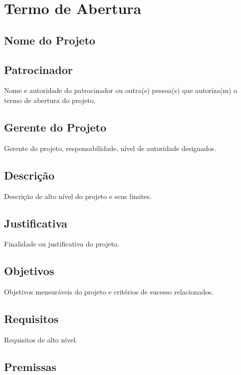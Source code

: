 \section{Termo de Abertura}

\subsection{Nome do Projeto}

\subsection{Patrocinador}

Nome e autoridade do patrocinador ou outra(s) pessoa(s) que autoriza(m) o termo de abertura do projeto.

\subsection{Gerente do Projeto}

Gerente do projeto, responsabilidade, nível de autoridade designados.

\subsection{Descrição}

Descrição de alto nível do projeto e seus limites.

\subsection{Justificativa}

Finalidade ou justificativa do projeto.

\subsection{Objetivos}

Objetivos mensuráveis do projeto e critérios de sucesso relacionados.

\subsection{Requisitos}

Requisitos de alto nível.

\subsection{Premissas}

